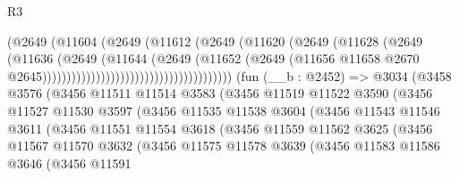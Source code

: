 \begin{lexlean}{R3}
\begin{coremodule}
                                                  (@2649
                                                    (@11604
                                                      (@2649
                                                        (@11612
                                                          (@2649
                                                            (@11620
                                                              (@2649
                                                                (@11628
                                                                  (@2649
                                                                    (@11636
                                                                      (@2649
                                                                        (@11644
                                                                          (@2649
                                                                            (@11652
                                                                              (@2649
                                                                                (@11656
                                                                                  @11658
                                                                                  @2670
                                                                                  @2645)))))))))))))))))))))))))))))))))))))))
    (fun (__b : @2452) =>
    @3034
      (@3458
        @3576
        (@3456
          @11511
          @11514
          @3583
          (@3456
            @11519
            @11522
            @3590
            (@3456
              @11527
              @11530
              @3597
              (@3456
                @11535
                @11538
                @3604
                (@3456
                  @11543
                  @11546
                  @3611
                  (@3456
                    @11551
                    @11554
                    @3618
                    (@3456
                      @11559
                      @11562
                      @3625
                      (@3456
                        @11567
                        @11570
                        @3632
                        (@3456
                          @11575
                          @11578
                          @3639
                          (@3456
                            @11583
                            @11586
                            @3646
                            (@3456
                              @11591

\end{coremodule}
\end{lexlean}
